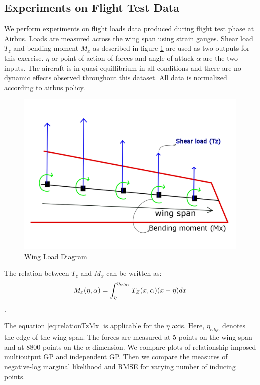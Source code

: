 \subsection{Experiments on Flight Test Data}\label{subsec:expFlightLoadsData}
We perform experiments on flight loads data produced during flight test phase at Airbus. Loads are measured across the wing span using strain gauges. Shear load \(T_{z}\) and bending moment \(M_{x}\) as described in figure \ref{fig:wingLoadDiagram} are used as two outputs for this exercise. \(\eta\) or point of action of forces and angle of attack \(\alpha\) are the two inputs. The aircraft is in quasi-equillibrium in all conditions and there are no dynamic effects observed throughout this dataset. All data is normalized according to airbus policy.

\begin{figure}
\centering
\includegraphics[width=0.5\columnwidth]{images/wingLoadDiagram.png}
\caption{Wing Load Diagram}
\label{fig:wingLoadDiagram}
\end{figure}


The relation between \(T_{z}\) and \(M_{x}\) can be written as:
\begin{equation}\label{eq:relationTzMx}
\centering
M_{x}(\eta, \alpha) = \int_{\eta}^{\eta_{edge}} T_{Z}(x, \alpha)(x-\eta)dx
\end{equation}.


The equation \ref{eq:relationTzMx} is applicable for the \(\eta\) axis. Here, \(\eta_{edge}\) denotes the edge of the wing span. The forces are measured at 5 points on the wing span and at 8800 points on the \(\alpha\) dimension. We compare plots of relationship-imposed multioutput GP and independent GP. Then we compare the measures of negative-log marginal likelihood and RMSE for varying number of inducing points.

